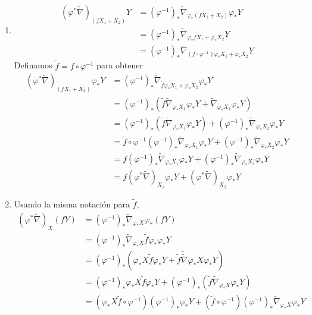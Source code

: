 \documentclass[11pt]{article}
\begin{document}
\begin{enumerate}
		\item 
		\begin{align*}        (\varphi^*\widetilde{\nabla})_{(fX_1+X_2)}Y&=(\varphi^{-1})_*\widetilde{\nabla}_{\varphi_*(fX_1+X_2)}\varphi_*Y\\
			&=(\varphi^{-1})_*\widetilde{\nabla}_{\varphi_*fX_1+\varphi_*X_2}Y\\
			&=(\varphi^{-1})_*\widetilde{\nabla}_{(f\circ\varphi^{-1})\varphi_*X_1+\varphi_*X_2}Y
		\end{align*}
		Definamos $\tilde{f}=f\circ\varphi^{-1}$ para obtener
		\begin{align*}        (\varphi^*\widetilde{\nabla})_{(fX_1+X_2)}\varphi_*Y&=(\varphi^{-1})_*\widetilde{\nabla}_{\tilde{f}\varphi_*X_1+\varphi_*X_2}\varphi_*Y\\
			&=(\varphi^{-1})_*(\tilde{f}\widetilde{\nabla}_{\varphi_*X_1}\varphi_*Y+\widetilde{\nabla}_{\varphi_*X_2}\varphi_*Y)\\
			&=(\varphi^{-1})_*(\tilde{f}\widetilde{\nabla}_{\varphi_*X_1}\varphi_*Y)+(\varphi^{-1})_*\widetilde{\nabla}_{\varphi_*X_2}\varphi_*Y\\
			&=\tilde{f}\circ\varphi^{-1}(\varphi^{-1})_*\widetilde{\nabla}_{\varphi_*X_1}\varphi_*Y+(\varphi^{-1})_*\widetilde{\nabla}_{\varphi_*X_2}\varphi_*Y\\
			&=f(\varphi^{-1})_*\widetilde{\nabla}_{\varphi_*X_1}\varphi_*Y+(\varphi^{-1})_*\widetilde{\nabla}_{\varphi_*X_2}\varphi_*Y\\
			&=f(\varphi^*\widetilde{\nabla})_{X_1}\varphi_*Y+(\varphi^*\widetilde{\nabla})_{X_2}\varphi_*Y
		\end{align*}
		\newpage
		\item Usando la misma notación para $\tilde{f}$,
		\begin{align*}       
			(\varphi^*\widetilde{\nabla})_{X}(fY)&=(\varphi^{-1})_*\widetilde{\nabla}_{\varphi_*X}\varphi_*(fY)\\
			&=(\varphi^{-1})_*\widetilde{\nabla}_{\varphi_*X}\tilde{f}\varphi_*\varphi_*Y\\
			&=(\varphi^{-1})_*\left( \varphi_*X\tilde{f}\varphi_*Y+\tilde{f}\widetilde{\widetilde{\nabla}}{\varphi_*X}\varphi_*Y\right)\\
			&=(\varphi^{-1})_*\varphi_*X\tilde{f}\varphi_*Y+(\varphi^{-1})_*(\tilde{f}\widetilde{\nabla}_{\varphi_*X}\varphi_*Y)\\
			&=(\varphi_*X\tilde{f}\circ\varphi^{-1})(\varphi^{-1})_*\varphi_*Y+(\tilde{f}\circ\varphi^{-1})(\varphi^{-1})_*\widetilde{\nabla}_{\varphi_*X}\varphi_*Y\\

\end{align*}
\end{enumerate}
\end{document}
